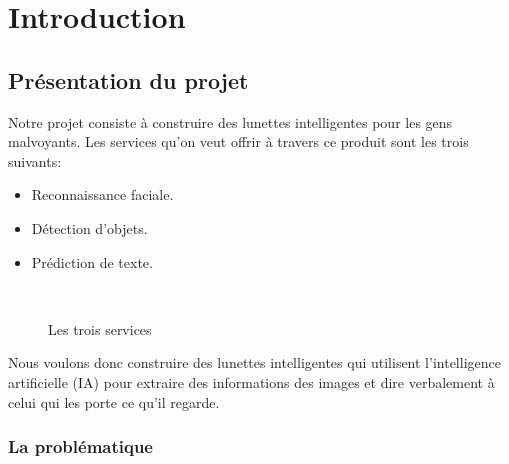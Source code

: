 {

\pagestyle{fancy}

\pagestyle{fancy}
\fancyhead{}


\hypersetup{linkcolor=black}


\tableofcontents\thispagestyle{fancy}
\listoffigures
\listoftables

\pagebreak
{}
\chapter{Introduction}\thispagestyle{fancy}


\section{Présentation du projet}
Notre projet consiste à construire des lunettes intelligentes pour les gens malvoyants. Les services qu'on veut offrir à travers ce produit sont les trois suivants:
\begin{itemize}
    \item Reconnaissance faciale.
    \item Détection d'objets.
    \item Prédiction de texte.
\end{itemize}

\begin{figure}[H] 
\centering
{}\\[0.5cm]
\caption{Les trois services}
\label{fig:figure17}
\end{figure}

Nous voulons donc construire des lunettes intelligentes qui utilisent l'intelligence artificielle (IA) pour extraire des informations des images et dire verbalement à celui qui les porte ce qu'il regarde.

\subsection{La problématique}

}
